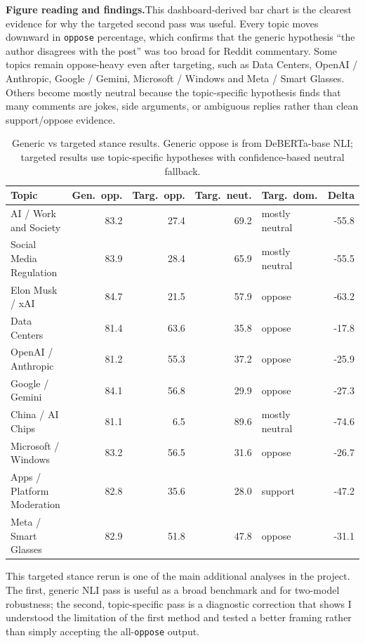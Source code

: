 \documentclass[11pt,a4paper]{article}
\newenvironment{extrabox}{%
  \par\medskip\noindent
  \def\FrameCommand{\fboxsep=6pt\fboxrule=0.6pt%
    \fcolorbox{extraboxrule}{extraboxbg}}%
  \MakeFramed{\advance\hsize-2\fboxsep\FrameRestore}%
  \noindent{\sffamily\bfseries\color{extraboxrule}Extra step.}\quad\ignorespaces%
}{\endMakeFramed\par\medskip}
\newcommand{\figureexplanation}[1]{%
  \par\smallskip\noindent\textbf{Figure reading and findings.}\quad #1\par\medskip%
}
\begin{document}
\figureexplanation{This dashboard-derived bar chart is the clearest evidence for why the targeted
second pass was useful. Every topic moves downward in \texttt{oppose} percentage, which confirms
that the generic hypothesis ``the author disagrees with the post'' was too broad for Reddit
commentary. Some topics remain oppose-heavy even after targeting, such as Data Centers, OpenAI /
Anthropic, Google / Gemini, Microsoft / Windows and Meta / Smart Glasses. Others become mostly
neutral because the topic-specific hypothesis finds that many comments are jokes, side arguments,
or ambiguous replies rather than clean support/oppose evidence.}

\begin{table}[H]
\centering
\footnotesize
\caption{Generic vs targeted stance results. Generic oppose is from DeBERTa-base NLI; targeted
results use topic-specific hypotheses with confidence-based neutral fallback.}
\label{tab:targeted-stance}
\renewcommand{\arraystretch}{1.12}
\begin{tabular}{p{3.2cm} r r r l r}
\toprule
\textbf{Topic} & \textbf{Gen.\ opp.} & \textbf{Targ.\ opp.} & \textbf{Targ.\ neut.} & \textbf{Targ.\ dom.} & \textbf{Delta} \\
\midrule
AI / Work and Society & 83.2 & 27.4 & 69.2 & mostly neutral & -55.8 \\
Social Media Regulation & 83.9 & 28.4 & 65.9 & mostly neutral & -55.5 \\
Elon Musk / xAI & 84.7 & 21.5 & 57.9 & oppose & -63.2 \\
Data Centers & 81.4 & 63.6 & 35.8 & oppose & -17.8 \\
OpenAI / Anthropic & 81.2 & 55.3 & 37.2 & oppose & -25.9 \\
Google / Gemini & 84.1 & 56.8 & 29.9 & oppose & -27.3 \\
China / AI Chips & 81.1 & 6.5 & 89.6 & mostly neutral & -74.6 \\
Microsoft / Windows & 83.2 & 56.5 & 31.6 & oppose & -26.7 \\
Apps / Platform Moderation & 82.8 & 35.6 & 28.0 & support & -47.2 \\
Meta / Smart Glasses & 82.9 & 51.8 & 47.8 & oppose & -31.1 \\
\bottomrule
\end{tabular}
\end{table}

\begin{extrabox}
This targeted stance rerun is one of the main additional analyses in the project. The first,
generic NLI pass is useful as a broad benchmark and for two-model robustness; the second,
topic-specific pass is a diagnostic correction that shows I understood the limitation of the first
method and tested a better framing rather than simply accepting the all-\texttt{oppose} output.
\end{extrabox}
\end{document}
